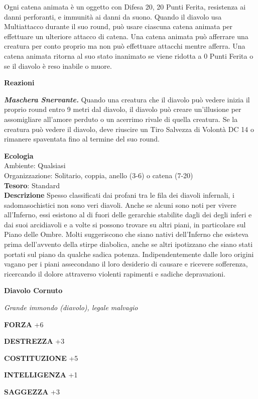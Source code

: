 \begin{multicols}{2}
	Ogni catena animata è un oggetto con Difesa 20, 20 Punti Ferita, resistenza ai danni perforanti, e immunità ai danni da suono. Quando il diavolo usa Multiattacco durante il suo round, può usare ciascuna catena animata per effettuare un ulteriore attacco di catena. Una catena animata può afferrare una creatura per conto proprio ma non può effettuare attacchi mentre afferra. Una catena animata ritorna al suo stato inanimato se viene ridotta a 0 Punti Ferita o se il diavolo è reso inabile o muore.

	\textbf{Reazioni}

	\textit{\textbf{Maschera Snervante.}} Quando una creatura che il diavolo può vedere inizia il proprio round entro 9 metri dal diavolo, il diavolo può creare un'illusione per assomigliare all'amore perduto o un acerrimo rivale di quella creatura. Se la creatura può vedere il diavolo, deve riuscire un Tiro Salvezza di Volontà DC 14 o rimanere spaventata fino al termine del suo round.

	\textbf{Ecologia}\\
	Ambiente: Qualsiasi\\
	Organizzazione: Solitario, coppia, anello (3-6) o catena (7-20)\\
	\textbf{Tesoro}: Standard\\
	\textbf{Descrizione}
	Spesso classificati dai profani tra le fila dei diavoli infernali, i sadomasochistici non sono veri diavoli. Anche se alcuni sono noti per vivere all'Inferno, essi esistono al di fuori delle gerarchie stabilite dagli dei degli inferi e dai suoi arcidiavoli e a volte si possono trovare su altri piani, in particolare sul Piano delle Ombre. Molti suggeriscono che siano nativi dell'Inferno che esisteva prima dell'avvento della stirpe diabolica, anche se altri ipotizzano che siano stati portati sul piano da qualche sadica potenza. Indipendentemente dalle loro origini vagano per i piani assecondano il loro desiderio di causare e ricevere sofferenza, ricercando il dolore attraverso violenti rapimenti e sadiche depravazioni.


	\medskip{}\textbf{Diavolo Cornuto}

	\textit{Grande immondo (diavolo), legale malvagio}

	\textbf{FORZA} +6

	\textbf{DESTREZZA} +3

	\textbf{COSTITUZIONE} +5

	\textbf{INTELLIGENZA} +1

	\textbf{SAGGEZZA} +3


\end{multicols}
